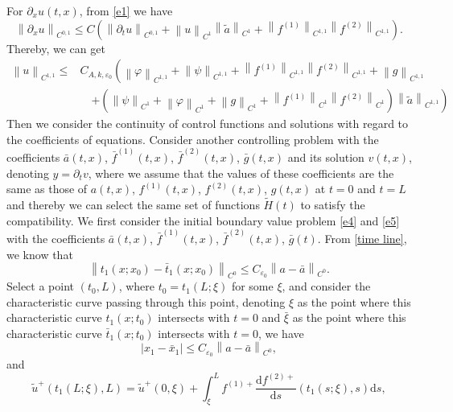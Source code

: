 \documentclass[a4paper,reqno,11pt]{amsart}
\numberwithin{equation}{section} %
\begin{document}
For $\partial _xu(t,x)$, from \eqref{e1} we have
$$
\left\| \partial _xu \right\| _{C^{0,1}}\leq C\left( \left\| \partial _tu \right\| _{C^{0,1}}+\left\lVert  u \right\rVert _{C^1}\left\| \tilde{a} \right\| _{C^1}+\left\| f^{(1)} \right\| _{C^{1,1}}\left\| f^{(2)} \right\| _{C^{1,1}} \right) .
$$
Thereby, we can get
\begin{equation}\label{continuity paradigm}
\begin{aligned}
\left\| u \right\| _{C^{1,1}}\leq & C_{A,k,\varepsilon _0}\left( \left\| \varphi \right\| _{C^{1,1}}+\left\| \psi \right\| _{C^{1,1}}+\left\| f^{(1)} \right\| _{C^{1,1}}\left\| f^{(2)} \right\| _{C^{1,1}}+\left\| g \right\| _{C^{1,1}}\right.\\
&\quad \left.+(\left\| \psi \right\| _{C^1}+\left\| \varphi \right\| _{C^1}+\left\| g \right\| _{C^1}+\left\| f^{(1)} \right\| _{C^1}\left\| f^{(2)} \right\| _{C^1})\left\| \tilde{a} \right\| _{C^{1,1}} \right) 
\end{aligned}
\end{equation}
Then we consider the continuity of control functions and solutions with regard to the coefficients of equations.
Consider another controlling problem with the coefficients $\bar{a} (t,x)$, $\bar{f}^{(1)} (t,x)$, $\bar{f}^{(2)} (t,x)$, $\bar{g} (t,x)$ and its solution $v(t,x)$, denoting $y = \partial_t v$, where we assume that the values of these coefficients are the same as those of $a(t,x)$, $f^{(1)}(t,x)$, $f^{(2)}(t,x)$, $g(t,x)$ at $t=0$ and $t=L$ and thereby we can select the same set of functions $\widetilde{H}(t)$ to satisfy the compatibility.
We first consider the initial boundary value problem \eqref{e4} and \eqref{e5} with the coefficients $\bar{a}(t,x)$, $\bar{f}^{(1)} (t,x)$, $\bar{f}^{(2)} (t,x)$, $\bar{g} (t)$.%
From \eqref{time line}, we know that
$$
\left\| t_1\left( x;x_0 \right) -\bar{t}_1\left( x;x_0 \right) \right\| _{C^0}\leq C_{\varepsilon _0} \left\lVert a-\bar{a}\right\rVert _{C^0}.
$$
Select a point $(t_0,L)$, where $t_0=t_1\left( L;\xi \right)$ for some $\xi$, and consider the characteristic curve passing through this point, denoting $\xi$ as the point where this characteristic curve $t_1(x;t_0)$ intersects with $t=0$ and $\bar{\xi}$ as the point where this characteristic curve $\bar{t}_1(x;t_0)$ intersects with $t=0$, we have
$$
\left| x_1-\bar{x}_1 \right|\leq C_{\varepsilon _0}\left\| a-\bar{a} \right\| _{C^0},
$$
and
$$
\tilde{u}^{+}\left( t_1\left( L;\xi \right) ,L \right) =\tilde{u}^{+}(0,\xi )+\int_{\xi}^L{f^{(1)+}\frac{\mathrm{d}f^{(2)+}}{\mathrm{d}s}\left( t_1\left( s;\xi \right) ,s \right) \mathrm{d}s},
$$
\end{document}
